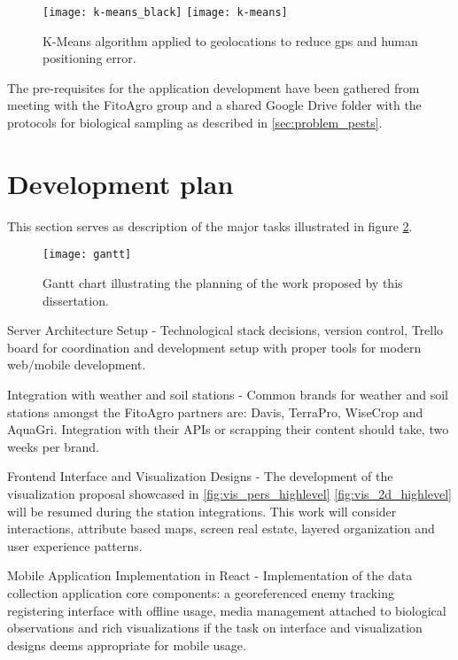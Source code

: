 \begin{figure}[htbp]
  \centering
    {\texttt{[image: k-means\_black]}}%
  \hfill  
    {\texttt{[image: k-means]}}%
  \caption{K-Means algorithm applied to geolocations to reduce gps and human positioning error.}
  \label{fig:k-means-clustering}
\end{figure}

The pre-requisites for the application development have been gathered from meeting with the FitoAgro group and a shared Google Drive folder with the protocols for biological sampling as described in \ref{sec:problem_pests}.

\section{Development plan}

This section serves as description of the major tasks illustrated in figure \ref{fig:gantt}.

\begin{figure}[htbp]
  \centering
  \texttt{[image: gantt]}
  \caption{Gantt chart illustrating the planning of the work proposed by this dissertation.}
  \label{fig:gantt}
\end{figure}

Server Architecture Setup - Technological stack decisions, version control, Trello board for coordination and development setup with proper tools for modern web/mobile development.

Integration with weather and soil stations - Common brands for weather and soil stations amongst the FitoAgro partners are: Davis, TerraPro, WiseCrop and AquaGri. Integration with their APIs or scrapping their content should take, two weeks per brand. 

Frontend Interface and Visualization Designs - The development of the visualization proposal showcased in \ref{fig:vis_pers_highlevel} \ref{fig:vis_2d_highlevel} will be resumed during the station integrations. This work will consider interactions, attribute based maps, screen real estate, layered organization and user experience patterns.

Mobile Application Implementation in React - Implementation of the data collection application core components: a georeferenced enemy tracking registering interface with offline usage, media management attached to biological observations and rich visualizations if the task on interface and visualization designs deems appropriate for mobile usage.

